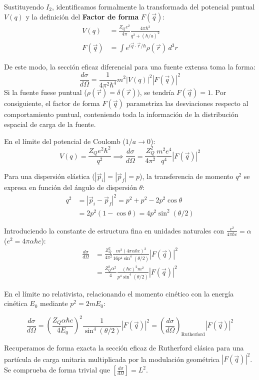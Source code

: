 Sustituyendo $I_2$, identificamos formalmente la transformada del potencial puntual $V(q)$ y la definición del \textbf{Factor de forma} $F(\vec{q})$:
\begin{align}
    V(q) &= \frac{Z_Q e^2}{4\pi} \frac{4\pi \hbar^2}{q^2 + (\hbar/a)^2} \\
    F(\vec{q}) &= \int e^{i \vec{q} \cdot \vec{r} / \hbar} \rho(\vec{r}) \, d^3r
\end{align}

De este modo, la sección eficaz diferencial para una fuente extensa toma la forma:
\begin{equation}
    \frac{d\sigma}{d\Omega} = \frac{1}{4\pi^2 \hbar^4} m^2 |V(q)|^2 |F(\vec{q})|^2
\end{equation}
Si la fuente fuese puntual ($\rho(\vec{r}) = \delta(\vec{r})$), se tendría $F(\vec{q}) = 1$. Por consiguiente, el factor de forma $F(\vec{q})$ parametriza las desviaciones respecto al comportamiento puntual, conteniendo toda la información de la distribución espacial de carga de la fuente.

En el límite del potencial de Coulomb ($1/a \to 0$):
\begin{equation}
    V(q) = \frac{Z_Q e^2 \hbar^2}{q^2} \implies \frac{d\sigma}{d\Omega} = \frac{Z_Q^2}{4\pi^2} \frac{m^2 e^4}{q^4} |F(\vec{q})|^2
\end{equation}

Para una dispersión elástica ($|\vec{p}_i| = |\vec{p}_f| = p$), la transferencia de momento $q^2$ se expresa en función del ángulo de dispersión $\theta$:
\begin{align}
    q^2 &= |\vec{p}_i - \vec{p}_f|^2 = p^2 + p^2 - 2 p^2 \cos\theta \nonumber \\
    &= 2p^2 (1 - \cos\theta) = 4 p^2 \sin^2(\theta/2)
\end{align}

Introduciendo la constante de estructura fina en unidades naturales con $\frac{e^2}{4\pi \hbar c} = \alpha$ ($e^2 = 4\pi \alpha \hbar c$):
\begin{align}
    \frac{d\sigma}{d\Omega} &= \frac{Z_Q^2}{4\pi^2} \frac{m^2 \left(4\pi \alpha \hbar c\right)^2}{16 p^4 \sin^4(\theta/2)} |F(\vec{q})|^2 \nonumber \\
    &= \frac{Z_Q^2 \alpha^2}{4} \frac{(\hbar c)^2 m^2}{p^4 \sin^4(\theta/2)} |F(\vec{q})|^2
\end{align}

En el límite no relativista, relacionando el momento cinético con la energía cinética $E_0$ mediante $p^2 = 2m E_0$:
\begin{concepto}
\begin{equation}
    \frac{d\sigma}{d\Omega} = \left( \frac{Z_Q \alpha \hbar c}{4 E_0} \right)^2 \frac{1}{\sin^4(\theta/2)} |F(\vec{q})|^2 = \left( \frac{d\sigma}{d\Omega} \right)_{\text{Rutherford}} |F(\vec{q})|^2
\end{equation}
\end{concepto}

Recuperamos de forma exacta la sección eficaz de Rutherford clásica para una partícula de carga unitaria multiplicada por la modulación geométrica $|F(\vec{q})|^2$. Se comprueba de forma trivial que $\left[ \frac{d\sigma}{d\Omega} \right] = L^2$.